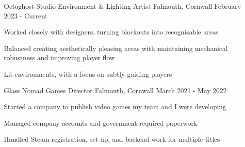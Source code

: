 

\begin{cventries}
    \cventry
        {Octoghost Studio}
        {Environment \& Lighting Artist}
        {Falmouth, Cornwall}
        {February 2023 - Current}
        {
            \begin{cvitems}
                \item Worked closely with designers, turning blockouts into recognisable areas
                \item Balanced creating aesthetically pleasing areas with maintaining mechanical robustness and improving player flow
                \item Lit environments, with a focus on subtly guiding players
            \end{cvitems}
        }

    \cventry
        {Glass Nomad Games}
        {Director}
        {Falmouth, Cornwall}
        {March 2021 - May 2022}
        {
            \begin{cvitems}
                \item Started a company to publish video games my team and I were developing
                \item Managed company accounts and government-required paperwork
                \item Handled Steam registration, set up, and backend work for multiple titles
            \end{cvitems}
        }



\end{cventries}
